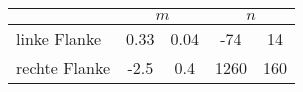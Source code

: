 \label{tab:geraden2}
	\begin{tabular}{lS[table-format=2.2]@{${}\pm{}$}S[table-format=1.2]S[table-format=4.0]@{${}\pm{}$}S[table-format=3.0]}
		\toprule
		{} &  &  \\
		\midrule
		{linke Flanke}  & 0.33 & 0.04 &  -74 &  14 \\
		{rechte Flanke} & -2.5 & 0.4  & 1260 & 160 \\
		\bottomrule
	\end{tabular}

